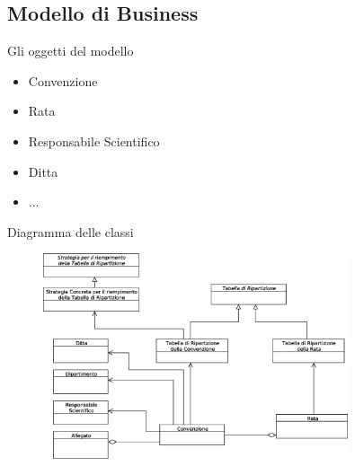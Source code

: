  
  \subsection{Modello di Business}
  \begin{frame}{Gli oggetti del modello}
     \begin{itemize}
      \item Convenzione
      \item Rata
      \item Responsabile Scientifico
      \item Ditta
      \item ...
     \end{itemize}

   
  \end{frame}
  
  \begin{frame}{Diagramma delle classi}
  
    \begin{figure}[h]
      \label{business_model}
      \centering
      \includegraphics[width=0.8\textwidth]{images/modello_business_simplified.eps}
    \end{figure}
   
  \end{frame}


  
  



